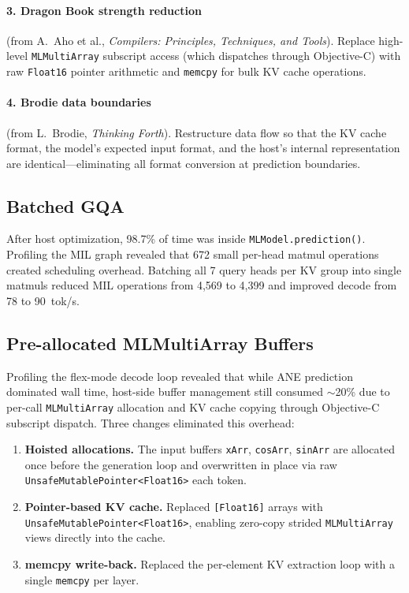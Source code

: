 \documentclass[11pt,twocolumn]{article}
\begin{document}
\paragraph{3. Dragon Book strength reduction} (from A.~Aho et al.,
\textit{Compilers: Principles, Techniques, and Tools}). Replace
high-level \texttt{MLMultiArray} subscript access (which dispatches
through Objective-C) with raw \texttt{Float16} pointer arithmetic and
\texttt{memcpy} for bulk KV cache operations.

\paragraph{4. Brodie data boundaries} (from L.~Brodie,
\textit{Thinking Forth}). Restructure data flow so that the KV cache
format, the model's expected input format, and the host's internal
representation are identical---eliminating all format conversion at
prediction boundaries.

\subsection{Batched GQA}

After host optimization, 98.7\% of time was inside
\texttt{MLModel.prediction()}. Profiling the MIL graph revealed that
672 small per-head matmul operations created scheduling overhead.
Batching all 7 query heads per KV group into single matmuls reduced
MIL operations from 4,569 to 4,399 and improved decode from 78 to
90~tok/s.

\subsection{Pre-allocated MLMultiArray Buffers}

Profiling the flex-mode decode loop revealed that while ANE prediction
dominated wall time, host-side buffer management still consumed
$\sim$20\% due to per-call \texttt{MLMultiArray} allocation and KV
cache copying through Objective-C subscript dispatch. Three changes
eliminated this overhead:

\begin{enumerate}
\item \textbf{Hoisted allocations.} The input buffers \texttt{xArr},
  \texttt{cosArr}, \texttt{sinArr} are allocated once before the
  generation loop and overwritten in place via raw
  \texttt{UnsafeMutablePointer<Float16>} each token.
\item \textbf{Pointer-based KV cache.} Replaced \texttt{[Float16]}
  arrays with \texttt{UnsafeMutablePointer<Float16>}, enabling zero-copy
  strided \texttt{MLMultiArray} views directly into the cache.
\item \textbf{memcpy write-back.} Replaced the per-element KV
  extraction loop with a single \texttt{memcpy} per layer.
\end{enumerate}
\end{document}
